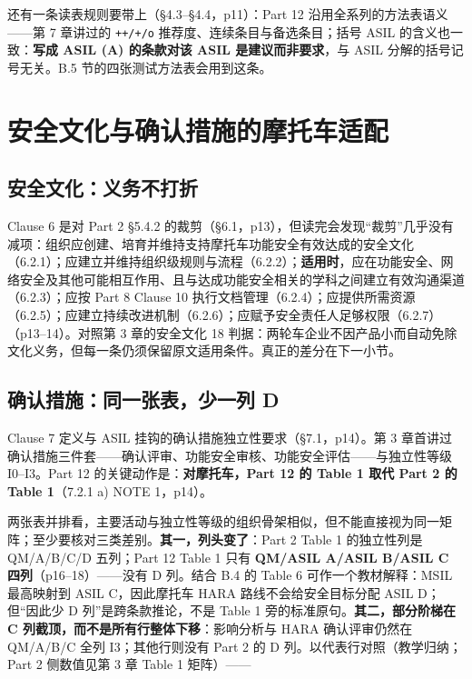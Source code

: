 还有一条读表规则要带上（§4.3–§4.4，p11）：Part 12 沿用全系列的方法表语义——第 7 章讲过的 \nolinkurl{++/+/o} 推荐度、连续条目与备选条目；括号 ASIL 的含义也一致：\textbf{写成 ASIL (A) 的条款对该 ASIL 是建议而非要求}，与 ASIL 分解的括号记号无关。B.5 节的四张测试方法表会用到这条。

\section{安全文化与确认措施的摩托车适配}

\subsection{安全文化：义务不打折}

Clause 6 是对 Part 2 §5.4.2 的裁剪（§6.1，p13），但读完会发现“裁剪”几乎没有减项：组织应创建、培育并维持支持摩托车功能安全有效达成的安全文化（6.2.1）；应建立并维持组织级规则与流程（6.2.2）；\textbf{适用时}，应在功能安全、网络安全及其他可能相互作用、且与达成功能安全相关的学科之间建立有效沟通渠道（6.2.3）；应按 Part 8 Clause 10 执行文档管理（6.2.4）；应提供所需资源（6.2.5）；应建立持续改进机制（6.2.6）；应赋予安全责任人足够权限（6.2.7）（p13–14）。对照第 3 章的安全文化 18 判据：两轮车企业不因产品小而自动免除文化义务，但每一条仍须保留原文适用条件。真正的差分在下一小节。

\subsection{确认措施：同一张表，少一列 D}

Clause 7 定义与 ASIL 挂钩的确认措施独立性要求（§7.1，p14）。第 3 章首讲过确认措施三件套——确认评审、功能安全审核、功能安全评估——与独立性等级 I0–I3。Part 12 的关键动作是：\textbf{对摩托车，Part 12 的 Table 1 取代 Part 2 的 Table 1}（7.2.1 a) NOTE 1，p14）。

两张表并排看，主要活动与独立性等级的组织骨架相似，但不能直接视为同一矩阵；至少要核对三类差别。\textbf{其一，列头变了}：Part 2 Table 1 的独立性列是 QM/A/B/C/D 五列；Part 12 Table 1 只有 \textbf{QM/ASIL A/ASIL B/ASIL C 四列}（p16–18）——没有 D 列。结合 B.4 的 Table 6 可作一个教材解释：MSIL 最高映射到 ASIL C，因此摩托车 HARA 路线不会给安全目标分配 ASIL D；但“因此少 D 列”是跨条款推论，不是 Table 1 旁的标准原句。\textbf{其二，部分阶梯在 C 列截顶，而不是所有行整体下移}：影响分析与 HARA 确认评审仍然在 QM/A/B/C 全列 I3；其他行则没有 Part 2 的 D 列。以代表行对照（教学归纳；Part 2 侧数值见第 3 章 Table 1 矩阵）——

